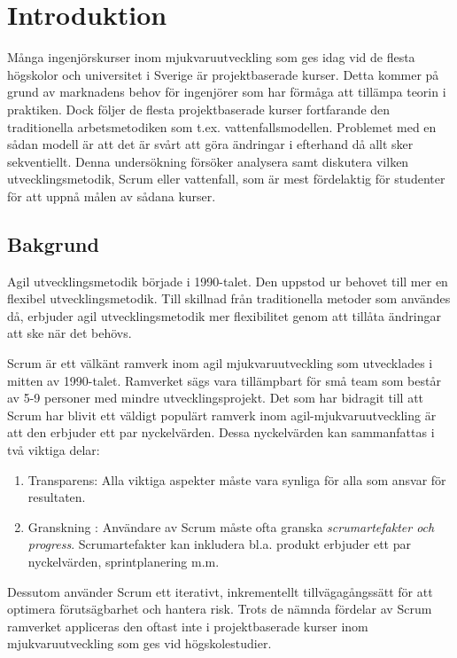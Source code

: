 \section{Introduktion}
\label{sec:Lieth_Wahid-introduction}
Många ingenjörskurser inom mjukvaruutveckling som ges idag vid de flesta högskolor och universitet i Sverige är projektbaserade
kurser. Detta kommer på grund av marknadens behov för ingenjörer som har förmåga att tillämpa teorin i praktiken. Dock följer de flesta  
projektbaserade kurser fortfarande den traditionella arbetsmetodiken som t.ex. vattenfallsmodellen. Problemet med en sådan modell är att 
det är svårt att göra ändringar i efterhand då allt sker sekventiellt. Denna undersökning försöker analysera samt diskutera vilken utvecklingsmetodik,
Scrum eller vattenfall, som är mest fördelaktig för studenter för att uppnå målen av sådana kurser.

\subsection{Bakgrund}Agil utvecklingsmetodik började i 1990-talet. Den uppstod ur behovet till mer en flexibel utvecklingsmetodik. Till skillnad från traditionella metoder som användes då, erbjuder agil utvecklingsmetodik mer flexibilitet genom att tillåta ändringar att ske när det behövs.

Scrum är ett välkänt ramverk inom agil mjukvaruutveckling som utvecklades i mitten av 1990-talet.\cite{TheScrum} 
Ramverket sägs vara tillämpbart för små team som består av 5-9 personer med mindre utvecklingsprojekt. Det som har bidragit till att Scrum har blivit ett väldigt populärt ramverk inom agil-mjukvaruutveckling är att den erbjuder ett par nyckelvärden. Dessa nyckelvärden kan sammanfattas i två viktiga delar: 
\begin{enumerate}\label{two}
	\item Transparens: Alla viktiga aspekter måste vara synliga för alla som ansvar för resultaten.\cite{TheScrum}
	\item Granskning : Användare av Scrum måste ofta granska \textit{scrumartefakter och progress}. Scrumartefakter kan inkludera
	bl.a. produkt erbjuder ett par nyckelvärden, sprintplanering m.m.\cite{TheScrum}
\end{enumerate} 
Dessutom använder Scrum ett iterativt, inkrementellt tillvägagångssätt för att optimera förutsägbarhet och hantera risk.\cite{TheScrum} Trots de nämnda fördelar av Scrum ramverket appliceras den oftast inte i projektbaserade kurser inom mjukvaruutveckling som ges vid högskolestudier. 

